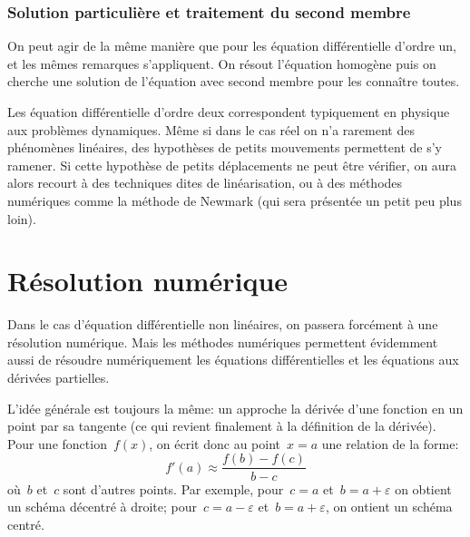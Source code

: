 \medskip
\subsubsection{Solution particulière et traitement du second membre} 

On peut agir de la même manière que pour les équation différentielle d'ordre un, et les mêmes remarques s'appliquent. On résout l'équation homogène puis on cherche une solution de l'équation avec second membre pour les connaître toutes. 

Les équation différentielle d'ordre deux correspondent typiquement en physique aux problèmes dynamiques. Même si dans le cas réel on n'a rarement des phénomènes linéaires, des hypothèses de petits mouvements permettent de s'y ramener. Si cette hypothèse de petits déplacements ne peut être vérifier, on aura alors recourt à des techniques dites de linéarisation, ou à des méthodes numériques comme la méthode de Newmark (qui sera présentée un petit peu plus loin).
 
\medskip
\section{Résolution numérique} 

Dans le cas d'équation différentielle non linéaires, on passera forcément à une résolution numérique. Mais les méthodes numériques permettent évidemment aussi de résoudre numériquement les équations différentielles et les équations aux dérivées partielles.

L'idée générale est toujours la même: un approche la dérivée d'une fonction en un point par sa tangente (ce qui revient finalement à la définition de la dérivée). Pour une fonction~$f(x)$, on écrit donc au point~$x=a$ une relation de la forme:
\begin{equation}
f'(a)\approx \frac{f(b)-f(c)}{b-c}
\end{equation}
où~$b$ et~$c$ sont d'autres points. Par exemple, pour~$c=a$ et~$b=a+\varepsilon$ on obtient un schéma décentré à droite; pour~$c=a-\varepsilon$ et~$b=a+\varepsilon$, on ontient un schéma centré.
 
